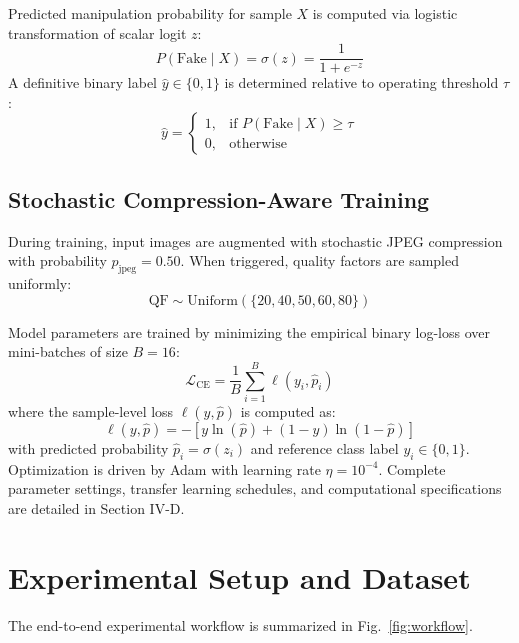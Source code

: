 \documentclass[conference]{IEEEtran}
\begin{document}
Predicted manipulation probability for sample $X$ is computed via logistic transformation of scalar logit $z$:
\begin{equation}
P(\text{Fake} \mid X) = \sigma(z) = \frac{1}{1 + e^{-z}}
\end{equation}
A definitive binary label $\hat{y} \in \{0, 1\}$ is determined relative to operating threshold $\tau$:
\begin{equation}
\hat{y} = \begin{cases} 1, & \text{if } P(\text{Fake} \mid X) \ge \tau \\ 0, & \text{otherwise} \end{cases}
\end{equation}

\subsection{Stochastic Compression-Aware Training}
During training, input images are augmented with stochastic JPEG compression with probability $p_{\text{jpeg}} = 0.50$. When triggered, quality factors are sampled uniformly:
\begin{equation}
\text{QF} \sim \text{Uniform}(\{20, 40, 50, 60, 80\})
\end{equation}

Model parameters are trained by minimizing the empirical binary log-loss over mini-batches of size $B = 16$:
\begin{equation}
\mathcal{L}_{\text{CE}} = \frac{1}{B} \sum_{i=1}^B \ell(y_i, \hat{p}_i)
\end{equation}
where the sample-level loss $\ell(y, \hat{p})$ is computed as:
\begin{equation}
\ell(y, \hat{p}) = - \left[ y \ln(\hat{p}) + (1 - y) \ln(1 - \hat{p}) \right]
\end{equation}
with predicted probability $\hat{p}_i = \sigma(z_i)$ and reference class label $y_i \in \{0, 1\}$. Optimization is driven by Adam with learning rate $\eta = 10^{-4}$. Complete parameter settings, transfer learning schedules, and computational specifications are detailed in Section IV-D.

\section{Experimental Setup and Dataset}

The end-to-end experimental workflow is summarized in Fig.~\ref{fig:workflow}.
\end{document}
